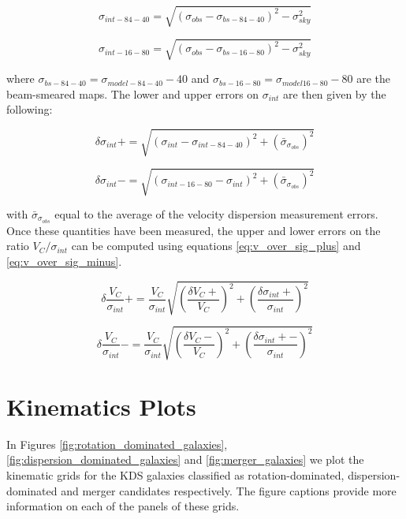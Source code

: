 \documentclass[fleqn,usenatbib]{mnras}
\begin{document}
\begin{equation}\label{eq:sig_84_40}
   \sigma_{int-84-40} = \sqrt{(\sigma_{obs} - \sigma_{bs-84-40})^{2} - \sigma_{sky}^{2}}
\end{equation}

\begin{equation}\label{eq:sig_16_80}
   \sigma_{int-16-80} = \sqrt{\left(\sigma_{obs} - \sigma_{bs-16-80}\right)^{2} - \sigma_{sky}^{2}}
\end{equation}

\noindent
where $\sigma_{bs-84-40} = \sigma_{model-84-40} - 40$ and $\sigma_{bs-16-80} = \sigma_{model16-80} - 80$ are the beam-smeared maps.
The lower and upper errors on $\sigma_{int}$ are then given by the following:

\begin{equation}\label{eq:sig_plus_error}
   \delta\sigma_{int}+ = \sqrt{\left(\sigma_{int} - \sigma_{int-84-40}\right)^{2} + \left(\bar{\sigma}_{\sigma_{obs}}\right)^{2}}
\end{equation}

\begin{equation}\label{eq:sig_minus_error}
   \delta\sigma_{int}- = \sqrt{\left(\sigma_{int-16-80} - \sigma_{int}\right)^{2} + \left(\bar{\sigma}_{\sigma_{obs}}\right)^{2}}
\end{equation}

\noindent
with $\bar{\sigma}_{\sigma_{obs}}$ equal to the average of the velocity dispersion measurement errors.
Once these quantities have been measured, the upper and lower errors on the ratio $V_{C}/\sigma_{int}$ can be computed using equations \ref{eq:v_over_sig_plus} and \ref{eq:v_over_sig_minus}.

\begin{equation}\label{eq:v_over_sig_plus}
   \delta\frac{V_{C}}{\sigma_{int}}+ = \frac{V_{C}}{\sigma_{int}}\sqrt{\left(\frac{\delta V_{C}+}{V_{C}}\right)^{2} + \left(\frac{\delta\sigma_{int}+}{\sigma_{int}}\right)^{2}}
\end{equation}

\begin{equation}\label{eq:v_over_sig_minus}
   \delta\frac{V_{C}}{\sigma_{int}}- = \frac{V_{C}}{\sigma_{int}}\sqrt{\left(\frac{\delta V_{C}-}{V_{C}}\right)^{2} + \left(\frac{\delta\sigma_{int}+-}{\sigma_{int}}\right)^{2}}
\end{equation}

\section{Kinematics Plots}\label{app:kinematics_plots}
In Figures \ref{fig:rotation_dominated_galaxies}, \ref{fig:dispersion_dominated_galaxies} and \ref{fig:merger_galaxies} we plot the kinematic grids for the KDS galaxies classified as rotation-dominated, dispersion-dominated and merger candidates respectively.
The figure captions provide more information on each of the panels of these grids.
\end{document}
